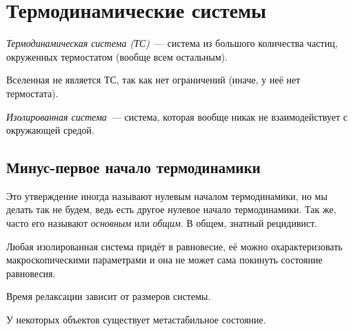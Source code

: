\documentclass[../main.tex]{subfiles}
\begin{document}
    \section{Термодинамические системы}
    \begin{definition}
        \emph{Термодинамическая система (ТС)}~--- система из большого количества частиц, окруженных термостатом (вообще всем остальным). 
    \end{definition}
    \begin{note}
        Вселенная не является ТС, так как нет ограничений (иначе, у неё нет термостата).
    \end{note}
    
    \begin{definition}
        \emph{Изолированная система}~--- система, которая вообще никак не взаимодействует с окружающей средой.
    \end{definition}
    
    \subsection{Минус-первое начало термодинамики}
        Это утверждение иногда называют нулевым началом термодинамики, но мы делать так не будем, ведь есть другое нулевое начало термодинамики. Так же, часто его называют \emph{основным} или \emph{общим}. В общем, знатный рецидивист.

    \begin{proposition}
        Любая изолированная система придёт в равновесие, её можно охарактеризовать макроскопическими параметрами и она не может сама покинуть состояние равновесия.
    \end{proposition}
        
    \begin{note}
        Время релаксации зависит от размеров системы.
    \end{note}
    \begin{note}
        У некоторых объектов существует метастабильное состояние.
    \end{note}
\end{document}
